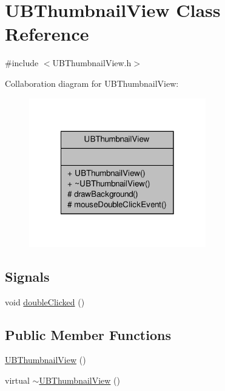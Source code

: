 \hypertarget{class_u_b_thumbnail_view}{\section{U\-B\-Thumbnail\-View Class Reference}
\label{de/de3/class_u_b_thumbnail_view}
}


{\ttfamily \#include $<$U\-B\-Thumbnail\-View.\-h$>$}



Collaboration diagram for U\-B\-Thumbnail\-View\-:
\nopagebreak
\begin{figure}[H]
\begin{center}
\leavevmode
\includegraphics[width=218pt]{d6/dfd/class_u_b_thumbnail_view__coll__graph}
\end{center}
\end{figure}
\subsection*{Signals}
\begin{DoxyCompactItemize}
\item 
void \hyperlink{class_u_b_thumbnail_view_a7f1ddd44a1dca43b728c6d68aecd33f5}{double\-Clicked} ()
\end{DoxyCompactItemize}
\subsection*{Public Member Functions}
\begin{DoxyCompactItemize}
\item 
\hyperlink{class_u_b_thumbnail_view_a56ca20e79108cb195cd7c5dfc7f410b7}{U\-B\-Thumbnail\-View} ()
\item 
virtual \hyperlink{class_u_b_thumbnail_view_a51fd743787501ddbe211b9893d61545a}{$\sim$\-U\-B\-Thumbnail\-View} ()
\end{DoxyCompactItemize}
